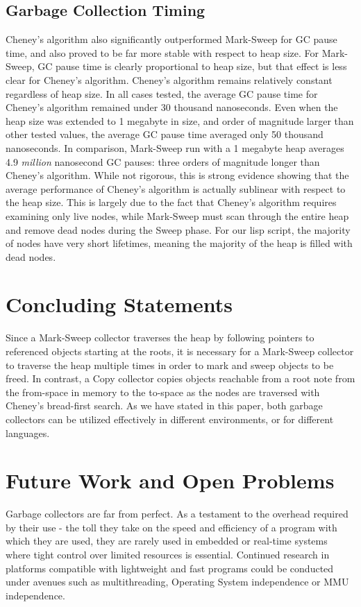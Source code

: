 \documentclass[11pt,leqno]{article}
\begin{document}
\subsection{Garbage Collection Timing}

Cheney's algorithm also significantly outperformed Mark-Sweep for GC pause time, and also proved to be far more stable with respect to heap size. For Mark-Sweep, GC pause time is clearly proportional to heap size, but that effect is less clear for Cheney's algorithm. Cheney's algorithm remains relatively constant regardless of heap size. In all cases tested, the average GC pause time for Cheney's algorithm remained under 30 thousand nanoseconds. Even when the heap size was extended to 1 megabyte in size, and order of magnitude larger than other tested values, the average GC pause time averaged only 50 thousand nanoseconds. In comparison, Mark-Sweep run with a 1 megabyte heap averages 4.9 \emph{million} nanosecond GC pauses: three orders of magnitude longer than Cheney's algorithm. While not rigorous, this is strong evidence showing that the average performance of Cheney's algorithm is actually sublinear with respect to the heap size. This is largely due to the fact that Cheney's algorithm requires examining only live nodes, while Mark-Sweep must scan through the entire heap and remove dead nodes during the Sweep phase. For our lisp script, the majority of nodes have very short lifetimes, meaning the majority of the heap is filled with dead nodes.


\section{Concluding Statements}
Since a Mark-Sweep collector traverses the heap by following pointers to referenced objects starting at the roots, it is necessary for a Mark-Sweep collector to traverse the heap multiple times in order to mark and sweep objects to be freed. In contrast, a Copy collector copies objects reachable from a root note from the from-space in memory to the to-space as the nodes are traversed with Cheney's bread-first search. As we have stated in this paper, both garbage collectors can be utilized effectively in different environments, or for different languages.

\section{Future Work and Open Problems}
Garbage collectors are far from perfect. As a testament to the overhead required by their use - the toll they take on the speed and efficiency of a program with which they are used, they are rarely used in embedded or real-time systems where tight control over limited resources is essential. Continued research in platforms compatible with lightweight and fast programs could be conducted under avenues such as multithreading, Operating System independence or MMU independence. 
\end{document}
